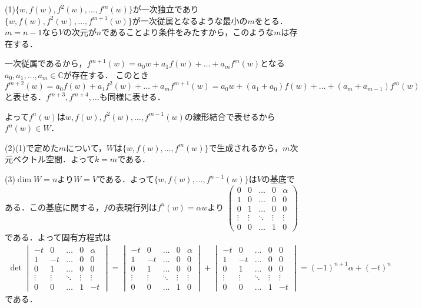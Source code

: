 \documentclass[
		book,
		head_space=20mm,
		foot_space=20mm,
		gutter=10mm,
		line_length=190mm
]{jlreq}
\begin{document}
(1)$\{w,f(w),f^2(w),\dots,f^m(w)\}$が一次独立であり$\{ w,f(w),f^2(w),\dots,f^{m+1}(w)\}$が一次従属となるような最小の$m$をとる．$m=n-1$なら$V$の次元が$n$であることより条件をみたすから，このような$m$は存在する．

一次従属であるから，$f^{m+1}(w)=a_0w+a_1f(w)+\dots+a_mf^m(w)$となる$a_0,a_1,\dots,a_m \in \mathbb{C}$が存在する．
このとき$f^{m+2}(w)=a_0f(w)+a_1f^2(w)+\dots+a_mf^{m+1}(w)=a_0w+(a_1+a_0)f(w)+\dots+(a_m+a_{m-1})f^m(w)$と表せる．$f^{m+3},f^{m+4},\dots$も同様に表せる．

よって$f^n(w)$は$w,f(w),f^2(w),\dots,f^{m-1}(w)$の線形結合で表せるから$f^n(w)\in W$．

(2)(1)で定めた$m$について，$W$は$\{ w,f(w),\dots,f^{m}(w)\}$で生成されるから，$m$次元ベクトル空間．よって$k=m$である．

(3)$\dim W=n$より$W=V$である．よって$\{w,f(w),\dots,f^{n-1}(w)\}$は$V$の基底である．この基底に関する，$f$の表現行列は$f^n(w)=\alpha w$より
$\begin{pmatrix}
	0 & 0 & \dots & 0 & \alpha \\
	1 & 0 & \dots & 0 & 0 \\
	0 & 1 & \dots & 0 & 0 \\
	\vdots & \vdots & \ddots & \vdots & \vdots \\
	0 & 0 & \dots & 1 & 0
\end{pmatrix}$である．よって固有方程式は
\begin{align}
	\det \begin{vmatrix}
		-t & 0 & \dots & 0 & \alpha \\
		1 & -t & \dots & 0 & 0 \\
		0 & 1 & \dots & 0 & 0 \\
		\vdots & \vdots & \ddots & \vdots & \vdots \\
		0 & 0 & \dots & 1 & -t
	\end{vmatrix}=\begin{vmatrix}
	-t & 0 & \dots & 0 & \alpha \\
	1 & -t & \dots & 0 & 0 \\
	0 & 1 & \dots & 0 & 0 \\
	\vdots & \vdots & \ddots & \vdots & \vdots \\
	0 & 0 & \dots & 1 & 0
\end{vmatrix}+\begin{vmatrix}
	-t & 0 & \dots & 0 & 0 \\
	1 & -t & \dots & 0 & 0 \\
	0 & 1 & \dots & 0 & 0 \\
	\vdots & \vdots & \ddots & \vdots & \vdots \\
	0 & 0 & \dots & 1 & -t
	\end{vmatrix} =(-1)^{n+1}\alpha+(-t)^n
\end{align}である．
\end{document}

